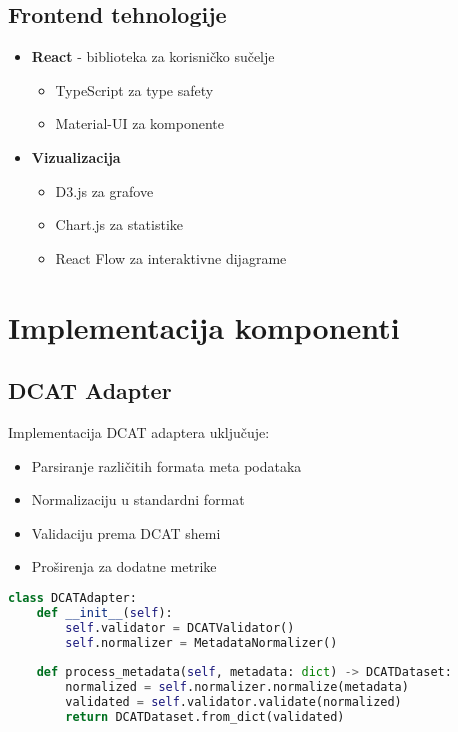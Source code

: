 \subsection{Frontend tehnologije}
\begin{itemize}
    \item \textbf{React} - biblioteka za korisničko sučelje
    \begin{itemize}
        \item TypeScript za type safety
        \item Material-UI za komponente
    \end{itemize}
    
    \item \textbf{Vizualizacija}
    \begin{itemize}
        \item D3.js za grafove
        \item Chart.js za statistike
        \item React Flow za interaktivne dijagrame
    \end{itemize}
\end{itemize}

\section{Implementacija komponenti}
\label{sec:components}

\subsection{DCAT Adapter}
Implementacija DCAT adaptera uključuje:
\begin{itemize}
    \item Parsiranje različitih formata meta podataka
    \item Normalizaciju u standardni format
    \item Validaciju prema DCAT shemi
    \item Proširenja za dodatne metrike
\end{itemize}

\begin{lstlisting}[language=Python, caption=Implementacija DCAT adaptera]
class DCATAdapter:
    def __init__(self):
        self.validator = DCATValidator()
        self.normalizer = MetadataNormalizer()
    
    def process_metadata(self, metadata: dict) -> DCATDataset:
        normalized = self.normalizer.normalize(metadata)
        validated = self.validator.validate(normalized)
        return DCATDataset.from_dict(validated)
\end{lstlisting}

